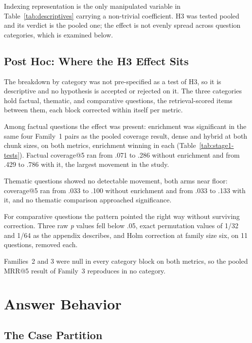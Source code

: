 Indexing representation is the only manipulated variable in
Table~\ref{tab:descriptives} carrying a non-trivial coefficient. H3 was tested pooled and its verdict is the
pooled one; the effect is not evenly spread across question categories, which
is examined below.

\subsection{Post Hoc: Where the H3 Effect Sits}

The breakdown by category was not pre-specified as a test of H3, so it is
descriptive and no hypothesis is accepted or rejected on it. The three
categories hold
\thesisNumQuestionsFactual{} factual, \thesisNumQuestionsThematic{} thematic, and
\thesisNumQuestionsComparative{} comparative questions, the
\thesisNumQuestionsScored{} retrieval-scored items between them, each block
corrected within itself per metric.

Among factual questions the effect was present: enrichment was significant in
the same four Family~1 pairs as the pooled coverage result, dense and hybrid at
both chunk sizes, on both metrics, enrichment winning in each
(Table~\ref{tab:stage1-tests}). Factual coverage@5 ran from .071 to .286
without enrichment and from .429 to .786 with it, the largest movement in the
study.

Thematic questions showed no detectable movement, both arms near floor:
coverage@5 ran from .033 to .100 without enrichment and from .033 to .133
with it, and no thematic comparison approached significance.

For comparative questions the pattern pointed the right way without surviving
correction. Three raw \emph{p} values fell below .05, exact permutation values
of 1/32 and 1/64 as the appendix describes, and Holm correction at family size six,
on 11 questions, removed each.

Families~2 and 3 were null in every category block on both metrics, so the
pooled MRR@5 result of Family~3 reproduces in no category.

\section{Answer Behavior}

\subsection{The Case Partition}

